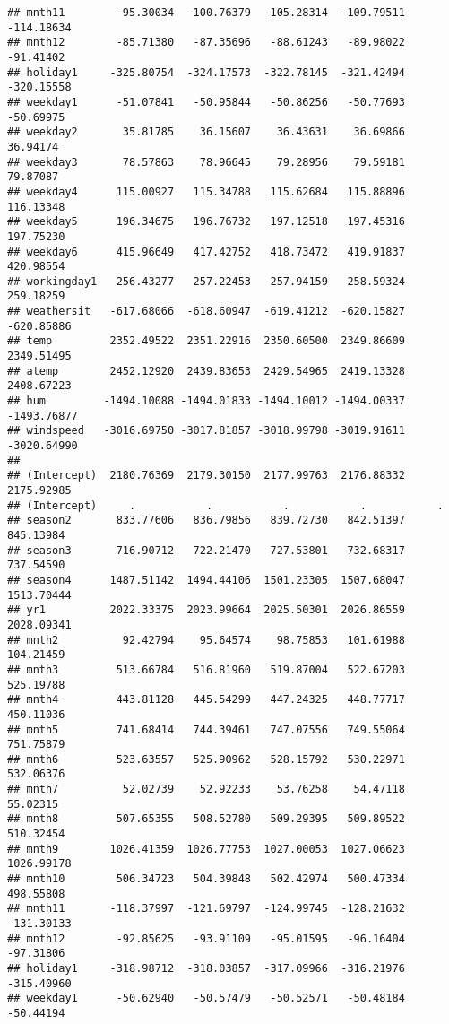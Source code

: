 \documentclass[]{article}
\begin{document}
\begin{verbatim}
## mnth11        -95.30034  -100.76379  -105.28314  -109.79511  -114.18634
## mnth12        -85.71380   -87.35696   -88.61243   -89.98022   -91.41402
## holiday1     -325.80754  -324.17573  -322.78145  -321.42494  -320.15558
## weekday1      -51.07841   -50.95844   -50.86256   -50.77693   -50.69975
## weekday2       35.81785    36.15607    36.43631    36.69866    36.94174
## weekday3       78.57863    78.96645    79.28956    79.59181    79.87087
## weekday4      115.00927   115.34788   115.62684   115.88896   116.13348
## weekday5      196.34675   196.76732   197.12518   197.45316   197.75230
## weekday6      415.96649   417.42752   418.73472   419.91837   420.98554
## workingday1   256.43277   257.22453   257.94159   258.59324   259.18259
## weathersit   -617.68066  -618.60947  -619.41212  -620.15827  -620.85886
## temp         2352.49522  2351.22916  2350.60500  2349.86609  2349.51495
## atemp        2452.12920  2439.83653  2429.54965  2419.13328  2408.67223
## hum         -1494.10088 -1494.01833 -1494.10012 -1494.00337 -1493.76877
## windspeed   -3016.69750 -3017.81857 -3018.99798 -3019.91611 -3020.64990
##                                                                        
## (Intercept)  2180.76369  2179.30150  2177.99763  2176.88332  2175.92985
## (Intercept)     .           .           .           .           .      
## season2       833.77606   836.79856   839.72730   842.51397   845.13984
## season3       716.90712   722.21470   727.53801   732.68317   737.54590
## season4      1487.51142  1494.44106  1501.23305  1507.68047  1513.70444
## yr1          2022.33375  2023.99664  2025.50301  2026.86559  2028.09341
## mnth2          92.42794    95.64574    98.75853   101.61988   104.21459
## mnth3         513.66784   516.81960   519.87004   522.67203   525.19788
## mnth4         443.81128   445.54299   447.24325   448.77717   450.11036
## mnth5         741.68414   744.39461   747.07556   749.55064   751.75879
## mnth6         523.63557   525.90962   528.15792   530.22971   532.06376
## mnth7          52.02739    52.92233    53.76258    54.47118    55.02315
## mnth8         507.65355   508.52780   509.29395   509.89522   510.32454
## mnth9        1026.41359  1026.77753  1027.00053  1027.06623  1026.99178
## mnth10        506.34723   504.39848   502.42974   500.47334   498.55808
## mnth11       -118.37997  -121.69797  -124.99745  -128.21632  -131.30133
## mnth12        -92.85625   -93.91109   -95.01595   -96.16404   -97.31806
## holiday1     -318.98712  -318.03857  -317.09966  -316.21976  -315.40960
## weekday1      -50.62940   -50.57479   -50.52571   -50.48184   -50.44194

\end{verbatim}
\end{document}
